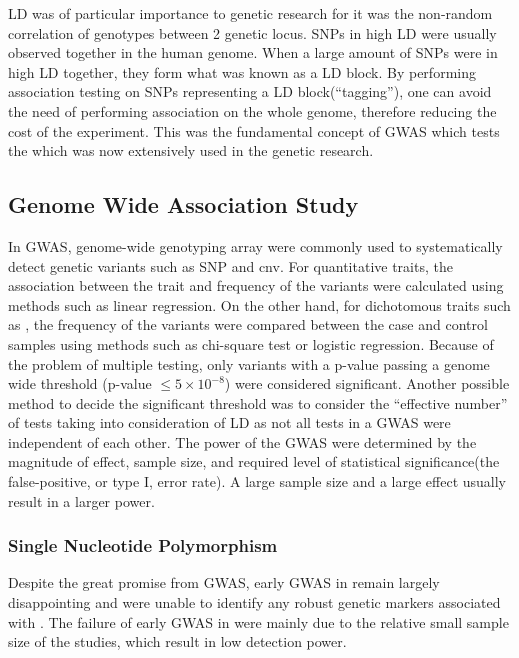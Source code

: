 \documentclass[12pt]{book}
\newcommand*{\glng}{\glsentrylong}
\begin{document}
	\gls{LD} was of particular importance to genetic research for it was the non-random correlation of genotypes between 2 genetic locus. 
	\glspl{SNP} in high \gls{LD} were usually observed together in the human genome.
	When a large amount of \glspl{SNP} were in high \gls{LD} together, they form what was known as a \gls{LD} block.
	By performing association testing on \glspl{SNP} representing a \gls{LD} block(``tagging''), one can avoid the need of performing association on the whole genome, therefore reducing the cost of the experiment.
	This was the fundamental concept of \gls{GWAS} which tests the 
	which was now extensively used in the genetic research.
	
	\subsection{Genome Wide Association Study}
	In \gls{GWAS}, genome-wide genotyping array were commonly used to systematically detect genetic variants such as \gls{SNP} and \gls{cnv}.
	For quantitative traits, the association between the trait and frequency of the variants were calculated using methods such as linear regression.
	On the other hand, for dichotomous traits such as \glng{scz}, the frequency of the variants were compared between the case and control samples using methods such as chi-square test or logistic regression.
	Because of the problem of multiple testing, only variants with a p-value passing a genome wide threshold (p-value $\le5\times10^{-8}$) were considered significant.
	Another possible method to decide the significant threshold was to consider the ``effective number'' of tests\citep{Li2011} taking into consideration of \gls{LD} as not all tests in a \gls{GWAS} were independent of each other. 
	The power of the \gls{GWAS} were determined by the magnitude of effect, sample size, and required level of statistical significance(the false-positive, or type I, error rate)\citep{Purcell2003}.
	A large sample size and a large effect usually result in a larger power.
	
	\subsubsection{Single Nucleotide Polymorphism} 
	Despite the great promise from \gls{GWAS}, early \gls{GWAS} in \glng{scz} remain largely disappointing and were unable to identify any robust genetic markers associated with \glng{scz}.
	The failure of early \gls{GWAS} in \glng{scz} were mainly due to the relative small sample size of the studies, which result in low detection power.
	
\end{document}
